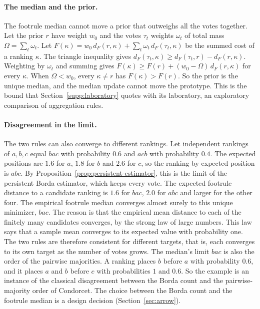 \paragraph{The median and the prior.} The footrule median cannot move a prior that outweighs all the votes together. Let the prior $r$ have weight $w_0$ and the votes $\tau_t$ weights $\omega_t$ of total mass $\Omega=\sum_t\omega_t$. Let $F(\kappa)=w_0\,d_F(r,\kappa)+\sum_t\omega_t\,d_F(\tau_t,\kappa)$ be the summed cost of a ranking $\kappa$. The triangle inequality gives $d_F(\tau_t,\kappa)\ge d_F(\tau_t,r)-d_F(r,\kappa)$. Weighting by $\omega_t$ and summing gives $F(\kappa)\ge F(r)+(w_0-\Omega)\,d_F(r,\kappa)$ for every $\kappa$. When $\Omega<w_0$, every $\kappa\neq r$ has $F(\kappa)>F(r)$. So the prior is the unique median, and the median update cannot move the prototype. This is the bound that Section~\ref{supp:laboratory} quotes with its laboratory, an exploratory comparison of aggregation rules.

\paragraph{Disagreement in the limit.}
The two rules can also converge to different rankings. Let independent rankings of $a,b,c$ equal $bac$ with probability $0.6$ and $acb$ with probability $0.4$. The expected positions are $1.6$ for $a$, $1.8$ for $b$ and $2.6$ for $c$, so the ranking by expected position is $abc$. By Proposition~\ref{prop:persistent-estimator}, this is the limit of the persistent Borda estimator, which keeps every vote. The expected footrule distance to a candidate ranking is $1.6$ for $bac$, $2.0$ for $abc$ and larger for the other four. The empirical footrule median converges almost surely to this unique minimizer, $bac$. The reason is that the empirical mean distance to each of the finitely many candidates converges, by the strong law of large numbers. This law says that a sample mean converges to its expected value with probability one. The two rules are therefore consistent for different targets, that is, each converges to its own target as the number of votes grows. The median's limit $bac$ is also the order of the pairwise majorities. A ranking places $b$ before $a$ with probability $0.6$, and it places $a$ and $b$ before $c$ with probabilities $1$ and $0.6$. So the example is an instance of the classical disagreement between the Borda count and the pairwise-majority order of Condorcet. The choice between the Borda count and the footrule median is a design decision (Section~\ref{sec:arrow}).

